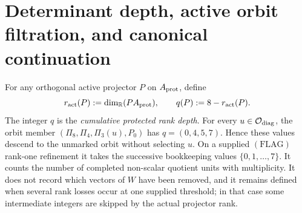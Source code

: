 \documentclass[12pt,a4paper]{article}
\begin{document}
\section{Determinant depth, active orbit filtration, and canonical continuation}
\label{p3c:sec:v196-depth-continuation}
\begin{definition}
\label{p3:def:cumulative-rank-depth}
For any orthogonal active projector \(P\) on \(A_{\rm prot}\), define
\begin{equation}
\label{p3:eq:cumulative-rank-depth}
 r_{\rm act}(P)
 :=\dim_{\mathbb{R}}(PA_{\rm prot}),
 \qquad
 q(P):=8-r_{\rm act}(P).
\end{equation}
The integer \(q\) is the \emph{cumulative protected rank depth}.  For every
\(u\in\mathcal O_{\rm diag}\), the orbit member
\((\Pi_8,\Pi_4,\Pi_3(u),P_0)\) has \(q=(0,4,5,7)\).  Hence these values
descend to the unmarked orbit without selecting \(u\).  On a supplied
\((\mathrm{FLAG})\) rank-one refinement it takes the successive bookkeeping
values \(\{0,1,\ldots,7\}\).  It counts the
number of completed non-scalar quotient units with multiplicity.  It
does not record which vectors of \(W\) have been removed, and it remains defined
when several rank losses occur at one supplied threshold; in that case
some intermediate integers are skipped by the actual projector rank.
\end{definition}
\end{document}
